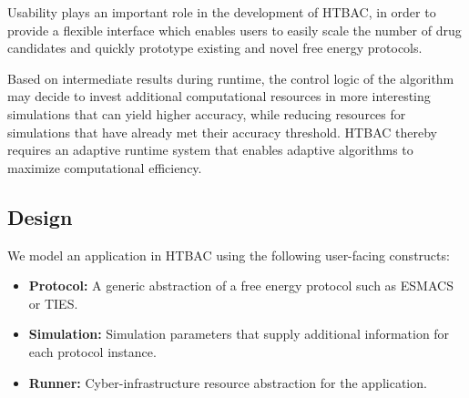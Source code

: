 
Usability plays an important role in the development of HTBAC, in order to
provide a flexible interface which enables users to easily scale the number
of drug candidates and quickly prototype existing and novel free energy
protocols.

Based on intermediate results during runtime, the control logic of the
algorithm may decide to invest additional computational resources in more
interesting simulations that can yield higher accuracy, while reducing
resources for simulations that have already met their accuracy threshold.
HTBAC thereby requires an adaptive runtime system 
 that enables adaptive algorithms to maximize computational
efficiency.

\subsection{Design}

We model an application in HTBAC using the following user-facing 
constructs:

\begin{itemize}
  \item \textbf{Protocol:} A generic abstraction of a free energy protocol
  such as ESMACS or TIES.
  \item \textbf{Simulation:} Simulation parameters that supply additional
  information for each protocol instance.
  \item \textbf{Runner:} Cyber-infrastructure resource abstraction for the
  application.
\end{itemize}

